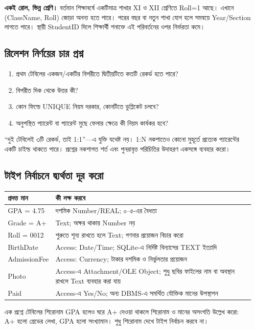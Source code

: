 \noindent\textbf{একই রোল, ভিন্ন শ্রেণি।} বর্তমান শিক্ষাবর্ষে একটিমাত্র শাখার XI ও XII শ্রেণিতে Roll=1 আছে। এখানে (ClassName, Roll) জোড়া অনন্য হতে পারে। পরের বছর বা নতুন শাখা যোগ হলে সমন্বয়ে Year/Section লাগতে পারে। স্থায়ী StudentID দিলে শিক্ষার্থী শনাক্তে এই পরিবর্তনের ওপর নির্ভরতা কমে।

\subsection{রিলেশন নির্ণয়ের চার প্রশ্ন}
\begin{enumerate}
\item প্রথম টেবিলের একজন/একটির বিপরীতে দ্বিতীয়টিতে কতটি রেকর্ড হতে পারে?
\item বিপরীত দিক থেকে উত্তর কী?
\item কোন ফিল্ডে UNIQUE নিয়ম দরকার, কোনটিতে ডুপ্লিকেট চলবে?
\item অনুপস্থিত প্যারেন্ট বা প্যারেন্ট মুছে ফেলার ক্ষেত্রে কী নিয়ম কার্যকর হবে?
\end{enumerate}
“দুই টেবিলেই ৩টি রেকর্ড, তাই 1:1”---এ যুক্তি যথেষ্ট নয়। 1:N নকশাতেও কোনো মুহূর্তে প্রত্যেক প্যারেন্টের একটি চাইল্ড থাকতে পারে। প্রশ্নের নকশাগত শর্ত এবং পুনরাবৃত্ত পরিচিতির উদাহরণ একসঙ্গে ব্যবহার করো।

\subsection{টাইপ নির্বাচনে দ্ব্যর্থতা দূর করো}
\begin{flushleft}
\small
\begin{tabularx}{0.98\linewidth}{|p{31mm}|X|}\hline
প্রদত্ত মান & কী লক্ষ করবে\\ \hline
GPA = 4.75 & দশমিক Number/REAL; ০--৫-এর বৈধতা\\ \hline
Grade = A+ & Text; অক্ষর থাকায় Number নয়\\ \hline
Roll = 0012 & শুরুতে শূন্য রাখতে হলে Text; গণনার প্রয়োজন বিচার করো\\ \hline
BirthDate & Access: Date/Time; SQLite-এ নির্দিষ্ট বিন্যাসের TEXT ইত্যাদি\\ \hline
AdmissionFee & Access: Currency; টাকার দশমিক ও নির্ভুলতার প্রয়োজন\\ \hline
Photo & Access-এ Attachment/OLE Object; শুধু ছবির ফাইলের নাম বা অবস্থান রাখলে Text ব্যবহার করা যায়\\ \hline
Paid & Access-এ Yes/No; অন্য DBMS-এ সমর্থিত যৌক্তিক মানের উপস্থাপন\\ \hline
\end{tabularx}
\end{flushleft}
এক প্রশ্নে টেবিলের শিরোনাম GPA হলেও ঘরে A+ দেওয়া থাকলে শিরোনাম ও মানের অসংগতি উল্লেখ করো: A+ হলো গ্রেডের লেখা, GPA হলো সংখ্যামান। শুধু শিরোনাম দেখে টাইপ নির্বাচন করবে না।

